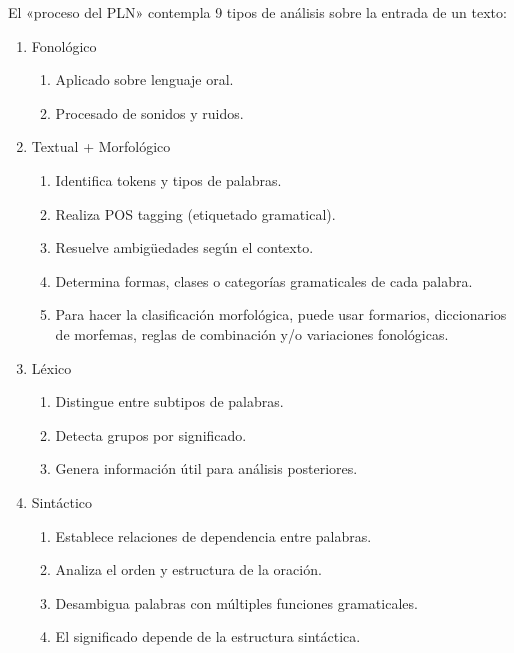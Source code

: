 \documentclass{report}
\begin{document}
El «proceso del PLN» contempla 9 tipos de análisis sobre la entrada de un texto:
\begin{enumerate}

    \item {Fonológico}
    \begin{enumerate}
        \item Aplicado sobre lenguaje oral.
        \item Procesado de sonidos y ruidos.
    \end{enumerate}

    \item {Textual + Morfológico} 
        \begin{enumerate}
            \item Identifica tokens y tipos de palabras.
            \item Realiza POS tagging (etiquetado gramatical).
            \item Resuelve ambigüedades según el contexto.
            \item Determina formas, clases o categorías gramaticales de cada palabra.
            \item Para hacer la clasificación morfológica, puede usar formarios, diccionarios de morfemas, reglas de combinación y/o variaciones fonológicas. 
        \end{enumerate}

    \item{Léxico}
    \begin{enumerate}
        \item Distingue entre subtipos de palabras.
        \item Detecta grupos por significado.
        \item Genera información útil para análisis posteriores.
    \end{enumerate}
        
    \item {Sintáctico}
    \begin{enumerate}
        \item Establece relaciones de dependencia entre palabras.
        \item Analiza el orden y estructura de la oración.
        \item Desambigua palabras con múltiples funciones gramaticales.
        \item El significado depende de la estructura sintáctica.
    \end{enumerate}


\end{enumerate}
\end{document}
